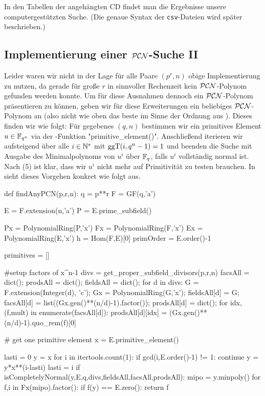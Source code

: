 In den Tabellen der angehängten CD findet man die Ergebnisse unsere
computergestützten Suche. (Die genaue Syntax der \texttt{csv}-Dateien wird
später beschrieben.)


\subsection{Implementierung einer $\mathcal{PCN}$-Suche II}
\label{subsec:impl_pcn_ii}

Leider waren wir nicht in der Lage für alle Paare $(p^r,n)$ obige Implementierung
zu nutzen, da gerade für große $r$ in sinnvoller Rechenzeit kein $\mathcal{PCN}$-Polynom
gefunden werden konnte. Um für diese Ausnahmen dennoch ein $\mathcal{PCN}$-Polynom
präsentieren zu können, geben wir für diese Erweiterungen ein beliebiges
$\mathcal{PCN}$-Polynom an (also nicht wie oben das beste im Sinne der Ordnung aus
). Dieses finden wir wie folgt: Für gegebenes $(q,n)$
bestimmen wir ein primitives Element $u \in \mathbb{F}_{q^n}$ via der \sage-Funktion
"primitive_element()". Anschließend iterieren wir aufsteigend über alle 
$i\in\mathbb{N}^\ast$ mit $\operatorname{ggT}(i,q^n-1) = 1$ und beenden die Suche mit
Ausgabe des Minimalpolynoms von $u^i$ über $\mathbb{F}_q$, falls
$u^i$ vollständig normal ist. Nach  (5) ist klar, dass
wir $u^i$ nicht mehr auf Primitivität zu testen brauchen.
In \sage sieht dieses Vorgehen konkret wie folgt aus.

\begin{sagecode}[caption={Aus \url{../Sage/findAnyPCN_additional.spyx}}]
def findAnyPCN(p,r,n):
    q = p**r
    F = GF(q,'a')

    E = F.extension(n,'a')
    P = E.prime_subfield()

    Px = PolynomialRing(P,'x')
    Fx = PolynomialRing(F,'x')
    Ex = PolynomialRing(E,'x')
    h = Hom(F,E)[0]
    primOrder = E.order()-1
    
    primitives = []
    
    #setup factors of x^n-1
    divs = get_proper_subfield_divisors(p,r,n)
    facsAll = dict();
    prodsAll = dict();
    fieldsAll = dict();
    for d in divs:
        G = F.extension(Integer(d), 'c');
        Gx = PolynomialRing(G,'x');
        fieldsAll[d] = G;
        facsAll[d] = list((Gx.gen()**(n/d)-1).factor());
        prodsAll[d] = dict();
        for idx,(f,mult) in enumerate(facsAll[d]):
            prodsAll[d][idx] = (Gx.gen()**(n/d)-1).quo_rem(f)[0]
    
    # get one primitive element
    x = E.primitive_element()
    
    lasti = 0
    y = x
    for i in itertools.count(1):
        if gcd(i,E.order()-1) != 1: continue
        y = y*x**(i-lasti)
        lasti = i
        if isCompletelyNormal(y,E,q,divs,fieldsAll,facsAll,prodsAll):
            mipo = y.minpoly()
            for f,i in Fx(mipo).factor():
                if f(y) == E.zero():
                    return f
\end{sagecode}


